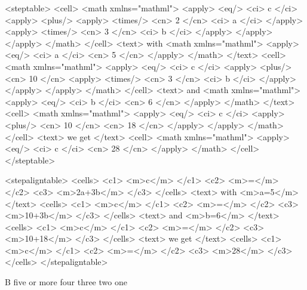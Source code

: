\typebuffer \processxmlbuffer

\startbuffer
<steptable>
  <cell>
    <math xmlns="mathml">
      <apply> <eq/> <ci> c </ci>
        <apply> <plus/>
          <apply> <times/> <cn> 2 </cn> <ci> a </ci> </apply>
          <apply> <times/> <cn> 3 </cn> <ci> b </ci> </apply>
        </apply>
      </apply>
    </math>
  </cell>
  <text> with
    <math xmlns="mathml">
      <apply> <eq/> <ci> a </ci> <cn> 5 </cn> </apply>
    </math>
  </text>
  <cell>
    <math xmlns="mathml">
      <apply> <eq/> <ci> c </ci>
        <apply> <plus/> <cn> 10 </cn>
          <apply> <times/> <cn> 3 </cn> <ci> b </ci> </apply>
        </apply>
      </apply>
    </math>
  </cell>
  <text> and
    <math xmlns="mathml">
      <apply> <eq/> <ci> b </ci> <cn> 6 </cn> </apply>
    </math>
  </text>
  <cell>
    <math xmlns="mathml">
      <apply> <eq/> <ci> c </ci>
        <apply> <plus/> <cn> 10 </cn> <cn> 18 </cn> </apply>
      </apply>
    </math>
  </cell>
  <text>
    we get
  </text>
  <cell>
    <math xmlns="mathml">
      <apply> <eq/> <ci> c </ci> <cn> 28 </cn> </apply>
    </math>
  </cell>
</steptable>
\stopbuffer

\typebuffer \processxmlbuffer

\startbuffer
<stepaligntable>
  <cells>
    <c1> <m>c</m> </c1> <c2> <m>=</m> </c2> <c3> <m>2a+3b</m> </c3>
  </cells>
  <text>
    with <m>a=5</m>
  </text>
  <cells>
    <c1> <m>c</m> </c1> <c2> <m>=</m> </c2> <c3> <m>10+3b</m> </c3>
  </cells>
  <text>
    and <m>b=6</m>
  </text>
  <cells>
    <c1> <m>c</m> </c1> <c2> <m>=</m> </c2> <c3> <m>10+18</m> </c3>
  </cells>
  <text>
    we get
  </text>
  <cells>
    <c1> <m>c</m> </c1> <c2> <m>=</m> </c2> <c3> <m>28</m> </c3>
  </cells>
</stepaligntable>
\stopbuffer

\typebuffer \processxmlbuffer

\stopsection

\startsection[title=\TEX\ example]

\startbuffer
\startSTEPchart
{}            {B}
          {five or more} 
          {four}         
        {three}        
         {two}          
 {one}
\stopSTEPchart
\stopbuffer

\typebuffer \getbuffer

\startbuffer
\startSTEPchart
{}
          
          
        
         
\stopSTEPchart
\stopbuffer


